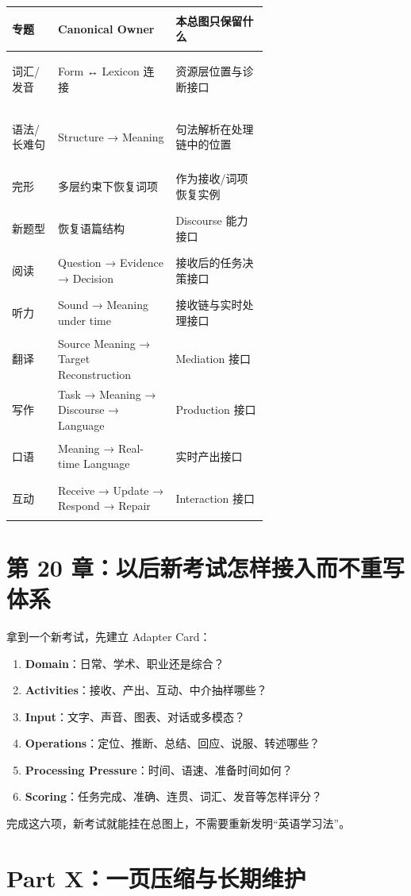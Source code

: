 \documentclass[11pt,a4paper]{ctexart}
\newcommand{\kw}[1]{\textbf{#1}}
\begin{document}
\begin{center}
\small
\begin{tabularx}{\linewidth}{>{\bfseries\raggedright\arraybackslash}p{0.18\linewidth} >{\raggedright\arraybackslash}p{0.46\linewidth} Y}
\toprule
专题 & Canonical Owner & 本总图只保留什么 \\
\midrule
词汇/发音 & Form ↔ Lexicon 连接 & 资源层位置与诊断接口 \\
语法/长难句 & Structure → Meaning & 句法解析在处理链中的位置 \\
完形 & 多层约束下恢复词项 & 作为接收/词项恢复实例 \\
新题型 & 恢复语篇结构 & Discourse 能力接口 \\
阅读 & Question → Evidence → Decision & 接收后的任务决策接口 \\
听力 & Sound → Meaning under time & 接收链与实时处理接口 \\
翻译 & Source Meaning → Target Reconstruction & Mediation 接口 \\
写作 & Task → Meaning → Discourse → Language & Production 接口 \\
口语 & Meaning → Real-time Language & 实时产出接口 \\
互动 & Receive → Update → Respond → Repair & Interaction 接口 \\
\bottomrule
\end{tabularx}
\end{center}

\section{第 20 章：以后新考试怎样接入而不重写体系}
拿到一个新考试，先建立 Adapter Card：
\begin{enumerate}
  \item \kw{Domain}：日常、学术、职业还是综合？
  \item \kw{Activities}：接收、产出、互动、中介抽样哪些？
  \item \kw{Input}：文字、声音、图表、对话或多模态？
  \item \kw{Operations}：定位、推断、总结、回应、说服、转述哪些？
  \item \kw{Processing Pressure}：时间、语速、准备时间如何？
  \item \kw{Scoring}：任务完成、准确、连贯、词汇、发音等怎样评分？
\end{enumerate}
完成这六项，新考试就能挂在总图上，不需要重新发明“英语学习法”。

\newpage
\section{Part X：一页压缩与长期维护}
\end{document}
